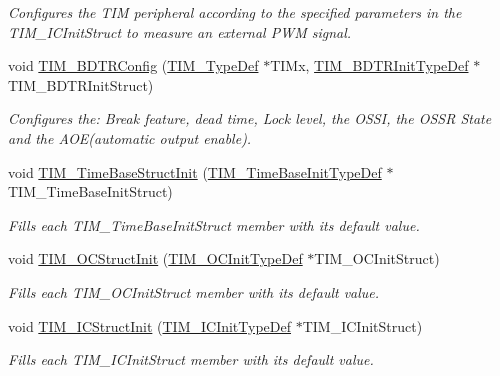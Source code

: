\begin{DoxyCompactItemize}
\begin{DoxyCompactList}\small\item\em Configures the T\+IM peripheral according to the specified parameters in the T\+I\+M\+\_\+\+I\+C\+Init\+Struct to measure an external P\+WM signal. \end{DoxyCompactList}\item 
void \mbox{\hyperlink{group___t_i_m___private___functions_ga3df4ba3f0727f63ce621e2b2e6035d4f}{T\+I\+M\+\_\+\+B\+D\+T\+R\+Config}} (\mbox{\hyperlink{struct_t_i_m___type_def}{T\+I\+M\+\_\+\+Type\+Def}} $\ast$T\+I\+Mx, \mbox{\hyperlink{struct_t_i_m___b_d_t_r_init_type_def}{T\+I\+M\+\_\+\+B\+D\+T\+R\+Init\+Type\+Def}} $\ast$T\+I\+M\+\_\+\+B\+D\+T\+R\+Init\+Struct)
\begin{DoxyCompactList}\small\item\em Configures the\+: Break feature, dead time, Lock level, the O\+S\+SI, the O\+S\+SR State and the A\+O\+E(automatic output enable). \end{DoxyCompactList}\item 
void \mbox{\hyperlink{group___t_i_m___private___functions_ga1556a0b9a5d53506875fd7de0cbc6b1f}{T\+I\+M\+\_\+\+Time\+Base\+Struct\+Init}} (\mbox{\hyperlink{struct_t_i_m___time_base_init_type_def}{T\+I\+M\+\_\+\+Time\+Base\+Init\+Type\+Def}} $\ast$T\+I\+M\+\_\+\+Time\+Base\+Init\+Struct)
\begin{DoxyCompactList}\small\item\em Fills each T\+I\+M\+\_\+\+Time\+Base\+Init\+Struct member with its default value. \end{DoxyCompactList}\item 
void \mbox{\hyperlink{group___t_i_m___private___functions_ga394683c78ae02837882e36014e11643e}{T\+I\+M\+\_\+\+O\+C\+Struct\+Init}} (\mbox{\hyperlink{struct_t_i_m___o_c_init_type_def}{T\+I\+M\+\_\+\+O\+C\+Init\+Type\+Def}} $\ast$T\+I\+M\+\_\+\+O\+C\+Init\+Struct)
\begin{DoxyCompactList}\small\item\em Fills each T\+I\+M\+\_\+\+O\+C\+Init\+Struct member with its default value. \end{DoxyCompactList}\item 
void \mbox{\hyperlink{group___t_i_m___private___functions_ga5005dac8e4e8a4c7fc2a0ef05b77cc50}{T\+I\+M\+\_\+\+I\+C\+Struct\+Init}} (\mbox{\hyperlink{struct_t_i_m___i_c_init_type_def}{T\+I\+M\+\_\+\+I\+C\+Init\+Type\+Def}} $\ast$T\+I\+M\+\_\+\+I\+C\+Init\+Struct)
\begin{DoxyCompactList}\small\item\em Fills each T\+I\+M\+\_\+\+I\+C\+Init\+Struct member with its default value. \end{DoxyCompactList}\item 

\end{DoxyCompactItemize}
